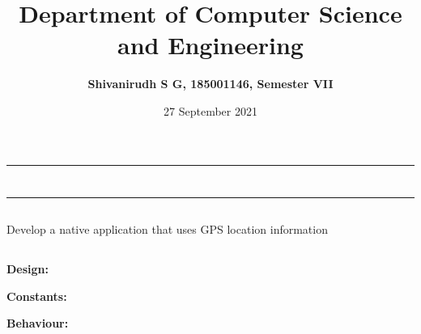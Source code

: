 \documentclass[12pt,letterpaper]{article}
\title{\textbf{Department of Computer Science and Engineering}}
\author{\textbf{Shivanirudh S G, 185001146, Semester VII }}
\date{27 September 2021}
\begin{document}
\maketitle
\hrule
\section*{}
\hrule 
\bigskip\bigskip

\subsection*{}

\subsection*{}
\begin{flushleft}
Develop a native application that uses GPS location information    
\end{flushleft}

\subsection*{}
\subsubsection*{}
\textbf{Design:}
\begin{flushleft}

\end{flushleft}

\textbf{Constants:}
\begin{flushleft}

\end{flushleft}
\begin{flushleft}

\end{flushleft}

\textbf{Behaviour:}
\begin{flushleft}

\end{flushleft}
\begin{flushleft}

\end{flushleft}
\end{document}

